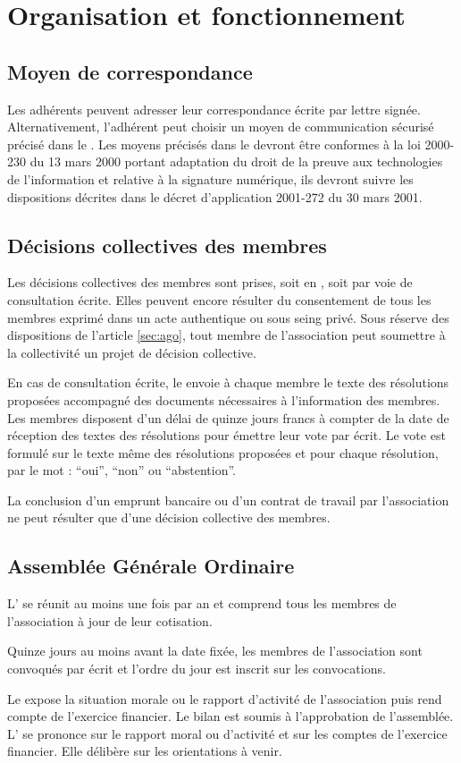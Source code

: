 \documentclass[a4paper,french,10pt]{article}
\newcommand{\article}[1]{\subsection{#1}\addtocounter{article}{1}}
\newcounter{article}
\newcommand{\artref}[1]{article \ref{#1}}
\begin{document}
\section{Organisation et fonctionnement}

\article{Moyen de correspondance}
\label{sec:moyen-de-corresp}
Les adhérents peuvent adresser leur correspondance écrite par lettre signée. Alternativement, l'adhérent peut choisir un moyen de communication sécurisé précisé dans le \RI{}. Les moyens précisés dans le \RI{} devront être conformes à la loi 2000-230 du 13 mars 2000 portant adaptation du droit de la preuve aux technologies de l'information et relative à la signature numérique, ils devront suivre les dispositions décrites dans le décret d'application 2001-272 du 30 mars 2001. 

\article{Décisions collectives des membres}
\label{sec:decisions-collectives}

Les décisions collectives des membres sont prises, soit en \AG{}, soit
par voie de consultation écrite. Elles peuvent encore résulter du
consentement de tous les membres exprimé dans un acte authentique ou
sous seing privé. Sous réserve des dispositions de l’\artref{sec:ago},
tout membre de l’association peut soumettre à la collectivité un
projet de décision collective.

En cas de consultation écrite, le \bureau{} envoie à chaque membre le
texte des résolutions proposées accompagné des documents nécessaires à
l’information des membres. Les membres disposent d’un délai de quinze
jours francs à compter de la date de réception des textes des
résolutions pour émettre leur vote par écrit. Le vote est formulé sur
le texte même des résolutions proposées et pour chaque résolution, par
le mot : “oui”, “non” ou “abstention”.

La conclusion d’un emprunt bancaire ou d’un contrat de travail par
l’association ne peut résulter que d’une décision collective des
membres.

\article{Assemblée Générale Ordinaire}
\label{sec:ago}
L’\AGO{} se réunit au moins une fois par an et comprend tous les membres de l’association à jour de leur cotisation.

Quinze jours au moins avant la date fixée, les membres de
l’association sont convoqués par écrit et l’ordre du jour est inscrit
sur les convocations.


Le \bureau{} expose la situation morale ou le rapport d'activité de
l'association puis rend compte de l'exercice financier. Le bilan est
soumis à l'approbation de l'assemblée. 
L’\AG{} se prononce sur le rapport moral ou d’activité et sur les comptes de l’exercice financier. Elle délibère sur les orientations à venir.
\end{document}
